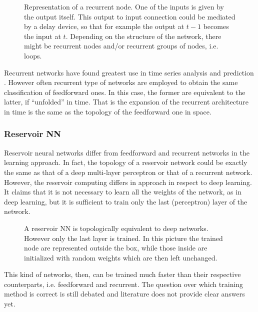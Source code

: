 \begin{figure}[ht]
	\centering
	
	\caption{%
		Representation of a recurrent node.
		One of the inputs is given by the output itself.
		This output to input connection could be mediated by a delay device, so that for example the output at $t-1$ becomes the input at $t$.
		Depending on the structure of the network, there might be recurrent nodes and/or recurrent groups of nodes, i.e. loops.
		}
	\label{fig:RecurrentNN}
\end{figure}

Recurrent networks have found greatest use in time series analysis and prediction \cite{duda2012pattern}.
However often recurrent type of networks are employed to obtain the same classification of feedforward ones.
In this case, the former are equivalent to the latter, if ``unfolded'' in time.
That is the expansion of the recurrent architecture in time is the same as the topology of the feedforward one in space.

\subsubsection{Reservoir NN}
\label{sssec:Reservoir_NN}
Reservoir neural networks differ from feedforward and recurrent networks in the learning approach.
In fact, the topology of a reservoir network could be exactly the same as that of a deep multi-layer perceptron or that of a recurrent network.
However, the reservoir computing differs in approach in respect to deep learning.
It claims that it is not necessary to learn all the weights of the network, as in deep learning, but it is sufficient to train only the last (perceptron) layer of the network.

\begin{figure}[ht]
	\centering
	
	\caption{A reservoir NN is topologically equivalent to deep networks. However only the last layer is trained. In this picture the trained node are represented outside the box, while those inside are initialized with random weights which are then left unchanged.}
	\label{fig:reservoirNN}
\end{figure}

\noindent This kind of networks, then, can be trained much faster than their respective counterparts, i.e. feedforward and recurrent.
The question over which training method is correct is still debated and literature does not provide clear answers yet.



